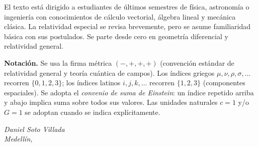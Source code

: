 \documentclass[12pt,oneside]{book}
\begin{document}
\medskip
El texto está dirigido a estudiantes de últimos semestres de física, astronomía o ingeniería con conocimientos de cálculo vectorial, álgebra lineal y mecánica clásica. La relatividad especial se revisa brevemente, pero se asume familiaridad básica con sus postulados. Se parte desde cero en geometría diferencial y relatividad general.

\medskip
\textbf{Notación.} Se usa la firma métrica $(-,+,+,+)$ (convención estándar de relatividad general y teoría cuántica de campos). Los índices griegos $\mu, \nu, \rho, \sigma, \ldots$ recorren $\{0,1,2,3\}$; los índices latinos $i,j,k,\ldots$ recorren $\{1,2,3\}$ (componentes espaciales). Se adopta el \emph{convenio de suma de Einstein}: un índice repetido arriba y abajo implica suma sobre todos sus valores. Las unidades naturales $c = 1$ y/o $G = 1$ se adoptan cuando se indica explícitamente.

\medskip
\begin{flushright}
\textit{Daniel Soto Villada}\\
\textit{Medellín, \the\year}
\end{flushright}

\tableofcontents
\clearpage

\clearpage
\hypersetup{pageanchor=true}
\mainmatter








\backmatter
\printbibliography[heading=bibintoc, title={Referencias}]
\end{document}
